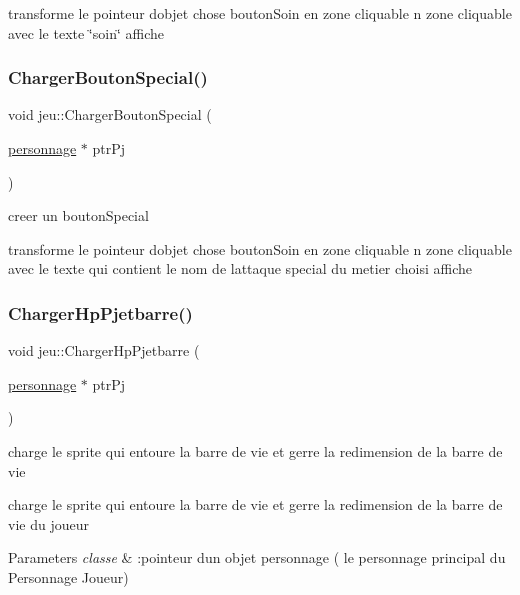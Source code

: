 transforme le pointeur d\textquotesingle{}objet chose bouton\+Soin en zone cliquable n zone cliquable avec le texte \char`\"{}soin\char`\"{} affiche \mbox{\label{classjeu_a78dcb0b1f6e462a994ddcf28ce059115}} 
\subsubsection{\texorpdfstring{Charger\+Bouton\+Special()}{ChargerBoutonSpecial()}}
{\footnotesize\ttfamily void jeu\+::\+Charger\+Bouton\+Special (\begin{DoxyParamCaption}\item[{\mbox{\hyperlink{classpersonnage}{personnage}} $\ast$}]{ptr\+Pj }\end{DoxyParamCaption})}



creer un bouton\+Special 

transforme le pointeur d\textquotesingle{}objet chose bouton\+Soin en zone cliquable n zone cliquable avec le texte qui contient le nom de l\textquotesingle{}attaque special du metier choisi affiche \mbox{\label{classjeu_a2793dcdba700455a3b1353dcc18a048e}} 
\subsubsection{\texorpdfstring{Charger\+Hp\+Pjetbarre()}{ChargerHpPjetbarre()}}
{\footnotesize\ttfamily void jeu\+::\+Charger\+Hp\+Pjetbarre (\begin{DoxyParamCaption}\item[{\mbox{\hyperlink{classpersonnage}{personnage}} $\ast$}]{ptr\+Pj }\end{DoxyParamCaption})}



charge le sprite qui entoure la barre de vie et gerre la redimension de la barre de vie 

charge le sprite qui entoure la barre de vie et gerre la redimension de la barre de vie du joueur


\begin{DoxyParams}{Parameters}
{\em classe} & \+:pointeur d\textquotesingle{}un objet personnage ( le personnage principal du Personnage Joueur) \\
\hline
\end{DoxyParams}
\mbox{\label{classjeu_a6cf6a0482228d4b76ba62a6589aab74e}} 
